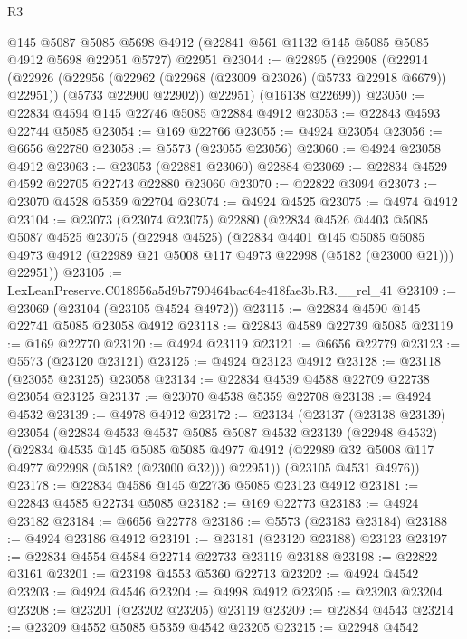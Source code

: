 \begin{lexlean}{R3}
\begin{coremodule}
    @145
    @5087
    @5085
    @5698
    @4912
    (@22841 @561 @1132 @145 @5085 @5085 @4912 @5698 @22951 @5727)
    @22951
@23044 := @22895
    (@22908
      (@22914
        (@22926
          (@22956 (@22962 (@22968 (@23009 @23026) (@5733 @22918 @6679)) @22951))
          (@5733 @22900 @22902))
        @22951)
      (@16138 @22699))
@23050 := @22834 @4594 @145 @22746 @5085 @22884 @4912
@23053 := @22843 @4593 @22744 @5085
@23054 := @169 @22766
@23055 := @4924 @23054
@23056 := @6656 @22780
@23058 := @5573 (@23055 @23056)
@23060 := @4924 @23058 @4912
@23063 := @23053 (@22881 @23060) @22884
@23069 := @22834 @4529 @4592 @22705 @22743 @22880 @23060
@23070 := @22822 @3094
@23073 := @23070 @4528 @5359 @22704
@23074 := @4924 @4525
@23075 := @4974 @4912
@23104 := @23073
    (@23074 @23075)
    @22880
    (@22834
      @4526
      @4403
      @5085
      @5087
      @4525
      @23075
      (@22948 @4525)
      (@22834
        @4401
        @145
        @5085
        @5085
        @4973
        @4912
        (@22989 @21 @5008 @117 @4973 @22998 (@5182 (@23000 @21)))
        @22951))
@23105 := LexLeanPreserve.C018956a5d9b7790464bac64e418fae3b.R3.__rel_41
@23109 := @23069 (@23104 (@23105 @4524 @4972))
@23115 := @22834 @4590 @145 @22741 @5085 @23058 @4912
@23118 := @22843 @4589 @22739 @5085
@23119 := @169 @22770
@23120 := @4924 @23119
@23121 := @6656 @22779
@23123 := @5573 (@23120 @23121)
@23125 := @4924 @23123 @4912
@23128 := @23118 (@23055 @23125) @23058
@23134 := @22834 @4539 @4588 @22709 @22738 @23054 @23125
@23137 := @23070 @4538 @5359 @22708
@23138 := @4924 @4532
@23139 := @4978 @4912
@23172 := @23134
    (@23137
      (@23138 @23139)
      @23054
      (@22834
        @4533
        @4537
        @5085
        @5087
        @4532
        @23139
        (@22948 @4532)
        (@22834
          @4535
          @145
          @5085
          @5085
          @4977
          @4912
          (@22989 @32 @5008 @117 @4977 @22998 (@5182 (@23000 @32)))
          @22951))
      (@23105 @4531 @4976))
@23178 := @22834 @4586 @145 @22736 @5085 @23123 @4912
@23181 := @22843 @4585 @22734 @5085
@23182 := @169 @22773
@23183 := @4924 @23182
@23184 := @6656 @22778
@23186 := @5573 (@23183 @23184)
@23188 := @4924 @23186 @4912
@23191 := @23181 (@23120 @23188) @23123
@23197 := @22834 @4554 @4584 @22714 @22733 @23119 @23188
@23198 := @22822 @3161
@23201 := @23198 @4553 @5360 @22713
@23202 := @4924 @4542
@23203 := @4924 @4546
@23204 := @4998 @4912
@23205 := @23203 @23204
@23208 := @23201 (@23202 @23205) @23119
@23209 := @22834 @4543
@23214 := @23209 @4552 @5085 @5359 @4542 @23205
@23215 := @22948 @4542

\end{coremodule}
\end{lexlean}
